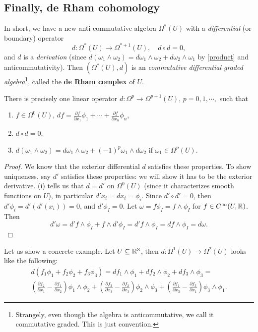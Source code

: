 \subsection{Finally, de Rham cohomology}
In short, we have a new anti-commutative algebra $\Omega^*(U)$ with a \emph{differential} (or boundary) operator \[
    d \colon \Omega^*(U) \to \Omega ^{*+1}(U),\quad d\circ d=0,
\] and $d$ is a \emph{derivation} (since $d(\omega_1\wedge \omega_2)=d\omega_1\wedge \omega_2+d\omega_2\wedge \omega_1$ by \cref{product} and anticommutativity). Then $(\Omega^*(U),d)$ is an \emph{commutative differential graded algebra}\footnote{Strangely, even though the algebra is anticommutative, we call it commutative graded. This is just convention.}, called the \textbf{de Rham complex} of $U$.

\begin{theorem}
    There is precisely one linear operator $d \colon \Omega^p \to \Omega^{p+1}(U)$, $p=0,1,\cdots ,$ such that 
    \begin{enumerate}[label=(\roman*)]
        \setlength\itemsep{-.2em}
    \item $f \in \Omega^0(U)$, $df=\frac{\partial f}{\partial x_1}\phi_1+ \cdots + \frac{\partial f}{\partial x_n }\phi_n $,
    \item $d \circ d=0$,
    \item $d(\omega_1\wedge \omega_2)=d\omega_1\wedge \omega_2+(-1)^p\omega_1\wedge d\omega_2$ if $\omega_1 \in \Omega^p(U)$.
    \end{enumerate}
\end{theorem}
\begin{proof}
    We know that the exterior differential $d$ satisfies these properties. To show uniqueness, say $d'$ satisfies these properties: we will show it has to be the exterior derivative. (i) tells us that $d=d'$ on $\Omega^0(U)$ (since it characterizes smooth functions on $U$), in particular $d'x_i =dx_i =\phi_i $. Since $d' \circ d'=0$, then $d'\phi_i=d'(d'(x_i ))=0 $, and $d' \phi_I=0$. Let $\omega=f \phi_I=f\wedge \phi_I$ for $f \in C^{\infty}(U,\mathbb{R})$. Then \[
    d' \omega=d' f\wedge \phi_I+f\wedge d'\phi_I=d'f\wedge \phi_I=df\wedge \phi_I=d\omega.
    \] 
\end{proof}
\begin{example}
    Let us show a concrete example. Let $U \subseteq \mathbb{R}^3$, then $d \colon \Omega^1 (U) \to \Omega^2(U)$ looks like the following:
    \begin{gather*}
        d(f_1\phi_1+f_2\phi_2+f_3\phi_3)=df_1\wedge \phi_1+df_2\wedge \phi_2+df_3\wedge \phi_3=\\
        \left( \frac{\partial f_2}{\partial x_1}-\frac{\partial f_1}{\partial x_2} \right) \phi_1\wedge \phi_2+\left( \frac{\partial f_3}{\partial x_3}-\frac{\partial f_2}{\partial x_3} \right) \phi_2\wedge \phi_3+\left( \frac{\partial f_1}{\partial x_3}-\frac{\partial f_3}{\partial x_1} \right) \phi_3\wedge \phi_1.
    \end{gather*}
\end{example}

